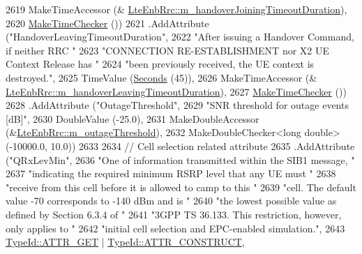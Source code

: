 \begin{DoxyCode}
2619                    MakeTimeAccessor (&
      \hyperlink{classns3_1_1LteEnbRrc_af6b40249d64556c103459131c70ee474}{LteEnbRrc::m\_handoverJoiningTimeoutDuration}),
2620                    \hyperlink{group__time_ga7032965bd4afa578691d88c09e4481c1}{MakeTimeChecker} ())
2621     .AddAttribute (\textcolor{stringliteral}{"HandoverLeavingTimeoutDuration"},
2622                    \textcolor{stringliteral}{"After issuing a Handover Command, if neither RRC "}
2623                    \textcolor{stringliteral}{"CONNECTION RE-ESTABLISHMENT nor X2 UE Context Release has "}
2624                    \textcolor{stringliteral}{"been previously received, the UE context is destroyed."},
2625                    TimeValue (\hyperlink{group__timecivil_ga33c34b816f8ff6628e33d5c8e9713b9e}{Seconds} (45)),
2626                    MakeTimeAccessor (&
      \hyperlink{classns3_1_1LteEnbRrc_acf57f59c97e8e1207d8eea66590fbc27}{LteEnbRrc::m\_handoverLeavingTimeoutDuration}),
2627                    \hyperlink{group__time_ga7032965bd4afa578691d88c09e4481c1}{MakeTimeChecker} ())
2628     .AddAttribute (\textcolor{stringliteral}{"OutageThreshold"},
2629                    \textcolor{stringliteral}{"SNR threshold for outage events [dB]"},
2630                    DoubleValue (-25.0), 
2631                    MakeDoubleAccessor (&\hyperlink{classns3_1_1LteEnbRrc_adf505b71799b8dbd81372695f14a0716}{LteEnbRrc::m\_outageThreshold}),
2632                    MakeDoubleChecker<long double> (-10000.0, 10.0))
2633 
2634     \textcolor{comment}{// Cell selection related attribute}
2635     .AddAttribute (\textcolor{stringliteral}{"QRxLevMin"},
2636                    \textcolor{stringliteral}{"One of information transmitted within the SIB1 message, "}
2637                    \textcolor{stringliteral}{"indicating the required minimum RSRP level that any UE must "}
2638                    \textcolor{stringliteral}{"receive from this cell before it is allowed to camp to this "}
2639                    \textcolor{stringliteral}{"cell. The default value -70 corresponds to -140 dBm and is "}
2640                    \textcolor{stringliteral}{"the lowest possible value as defined by Section 6.3.4 of "}
2641                    \textcolor{stringliteral}{"3GPP TS 36.133. This restriction, however, only applies to "}
2642                    \textcolor{stringliteral}{"initial cell selection and EPC-enabled simulation."},
2643                    \hyperlink{classns3_1_1TypeId_a3ab7b43b95f96391c514d609ca60e542a3dd4b476c9b257285c177d6c414b5fd0}{TypeId::ATTR\_GET} | \hyperlink{classns3_1_1TypeId_a3ab7b43b95f96391c514d609ca60e542aa8dc1d5d889cc9489244c94ede243d62}{TypeId::ATTR\_CONSTRUCT},

\end{DoxyCode}

